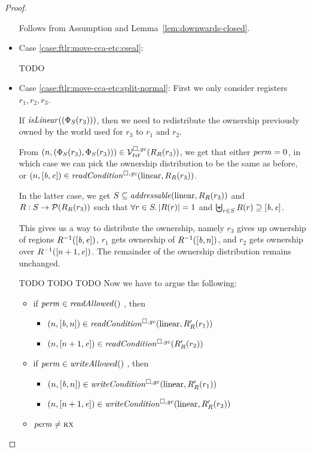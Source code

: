 \begin{proof}
\begin{itemize}
    Follows from Assumption and Lemma~\ref{lem:downwards-closed}.

  \item Case \ref{case:ftlr:move-cca-etc:cseal}:

TODO
  \item Case \ref{case:ftlr:move-cca-etc:split-normal}:
    First we only consider registers $r_1,r_2,r_3$.

    If $\isLinear{(\Phi_S(r_3))}$, then we need to redistribute the ownership
    previously owned by the world used for $r_3$ to $r_1$ and $r_2$.

    From $\left(n,(\Phi_S(r_3),\Phi_S(r_3))\right) \in \mathcal{V}^{\square,\mathit{gc}}_{\mathit{tst}}(R_R(r_3))$, we get that either $\mathit{perm} = \textsc{0}$, in which case we can pick the ownership distribution to be the same as before, or $\npair{[\baddr,\eaddr]} \in \readCond{\linear,R_R(r_3)}$.

    In the latter case, we get $S \subseteq \addressable{\linear,R_R(r_3)}$ and $R : S \rightarrow \mathcal{P}(R_R(r_3))$ such that $\forall r \in S \ldotp |R(r)| = 1$ and $\biguplus_{r\in S} R(r) \supseteq [\mathit{b},\mathit{e}]$.

    This gives us a way to distribute the ownership, namely $r_3$ gives up ownership of regions $R^{-1}([\mathit{b},\mathit{e}])$, $r_1$ gets ownership of $R^{-1}([\mathit{b},n])$, and $r_2$ gets ownership over $R^{-1}([n+1,\mathit{e}])$.
    The remainder of the ownership distribution remains unchanged.

TODO TODO TODO     
    Now we have to argue the following:
    \begin{itemize}
    \item if $\perm \in \readAllowed$, then
      \begin{itemize}
      \item $\npair{[\baddr,n]} \in \readCond{\linear,R_R'(r_1)}$
      \item $\npair{[n+1,\eaddr]} \in \readCond{R_R'(r_2)}$
      \end{itemize}
      
    \item if $\perm \in \writeAllowed$, then
      \begin{itemize}
      \item $\npair{[\baddr,n]} \in \writeCond{\linear,R_R'(r_1)}$
      \item $\npair{[n+1,\eaddr]} \in \writeCond{\linear,R_R'(r_2)}$
      \end{itemize}
    \item $\mathit{perm} \neq \textsc{rx}$


\end{itemize}
\end{itemize}
\end{proof}
